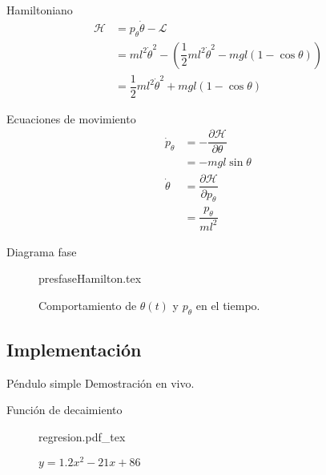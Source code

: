 \documentclass{beamer}
\begin{document}
\begin{frame}{Hamiltoniano}
\begin{equation}
 \begin{split}
  \mathcal H & = p_{\theta} \dot \theta - \mathcal L \\
  & = m l^2 \dot \theta ^2 - (\dfrac{1}{2}m l^2 \dot{\theta}^2 - m g l (1 - \cos{\theta}))\\
  & = \dfrac{1}{2}m l^2 \dot{\theta}^2 + m g l (1 - \cos{\theta})
 \end{split}
 \label{eq: hamiltonian pendulum}
\end{equation}
\end{frame}

\begin{frame}{Ecuaciones de movimiento}
    \begin{subequations}
 \begin{align}
  \dot p_{\theta} &= - \dfrac{\partial \mathcal H}{\partial \theta}\\
  &= -mgl \sin \theta \\
  \dot \theta &= \dfrac{\partial \mathcal H}{\partial p_{\theta}}\\
  &= \dfrac{p_{\theta}}{ml^2}
 \end{align}
\end{subequations}
\end{frame}


\begin{frame}{Diagrama fase}
 \begin{figure}[htb!]
 \centering 
 {presfaseHamilton.tex}
 \caption{Comportamiento de $\theta(t)$ y $p_{\theta}$ en el tiempo.}
 \label{fig: phase plot theta ptheta hamiltonian}
\end{figure}
\end{frame}


\subsection{Implementación}
\begin{frame}{Péndulo simple}
 Demostración en vivo.
\end{frame}



\begin{frame}{Función de decaimiento}
 \begin{figure}[htb!]
 \centering
{regresion.pdf_tex}
 \caption{$y = 1.2 x^2 - 21 x + 86$}
 \label{fig: regresion}
\end{figure}
\end{frame}
\end{document}

